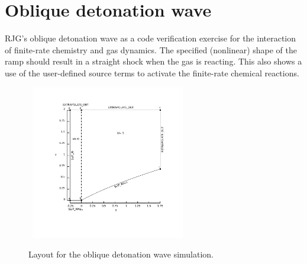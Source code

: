 
\section{Oblique detonation wave}
%
RJG's oblique detonation wave as a code verification exercise for the interaction
of finite-rate chemistry and gas dynamics.
The specified (nonlinear) shape of the ramp should result in a straight shock
when the gas is reacting.
This also shows a use of the user-defined source terms to activate the finite-rate chemical reactions.

\begin{figure}[htbp]
\begin{center}
\mbox{
\includegraphics[width=0.6\textwidth,viewport=66 80 396 406]{../2D/odw/odw-layout.pdf}
}
\end{center}
\caption{Layout for the oblique detonation wave simulation.}
\label{odw-layout-fig}
\end{figure}

